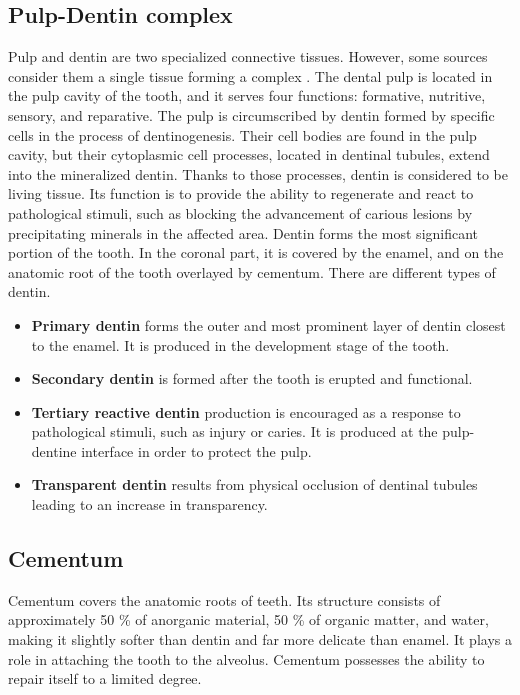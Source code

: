 \subsection*{Pulp-Dentin complex}
Pulp and dentin are two specialized connective tissues. However, some sources consider them a single tissue forming a complex \cite{2019a}.
The dental pulp is located in the pulp cavity of the tooth, and it serves four functions: formative, nutritive, sensory, and reparative.
The pulp is circumscribed by dentin formed by specific cells in the process of dentinogenesis. Their cell bodies are found in the pulp cavity, but their cytoplasmic cell processes, located in dentinal tubules, extend into the mineralized dentin. Thanks to those processes, dentin is considered to be living tissue. Its function is to provide the ability to regenerate and react to pathological stimuli, such as blocking the advancement of carious lesions by precipitating minerals in the affected area.
Dentin forms the most significant portion of the tooth. In the coronal part, it is covered by the enamel, and on the anatomic root of the tooth overlayed by cementum. There are different types of dentin.
\begin{itemize}
    \item \textbf{Primary dentin} forms the outer and most prominent layer of dentin closest to the enamel. It is produced in the development stage of the tooth.
    \item \textbf {Secondary dentin} is formed after the tooth is erupted and functional.
    \item \textbf{Tertiary reactive dentin} production is encouraged as a response to pathological stimuli, such as injury or caries. It is produced at the pulp-dentine interface in order to protect the pulp.
    \item \textbf{Transparent dentin} results from physical occlusion of dentinal tubules leading to an increase in transparency.
\end{itemize}


\subsection*{Cementum}
Cementum covers the anatomic roots of teeth. Its structure consists of approximately 50 \% of anorganic material, 50 \% of organic matter, and water, making it slightly softer than dentin and far more delicate than enamel. It plays a role in attaching the tooth to the alveolus. Cementum possesses the ability to repair itself to a limited degree.

